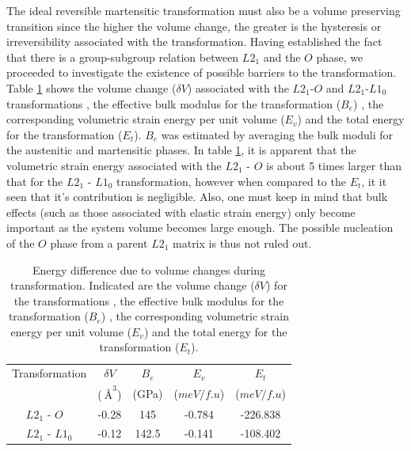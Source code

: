 \documentclass[%
preprint,
 amsmath,amssymb,
 aps,
prb,
showkeys,
]{revtex4-1}
\begin{document}
The ideal reversible martensitic transformation must also be a volume preserving transition \cite{bhattacharya1998theory} since the higher the volume change, the greater is the hysteresis or irreversibility associated with the transformation. Having established the fact that there is a group-subgroup relation between $L2_1$ and the $O$ phase, we proceeded to investigate the existence of possible barriers to the transformation. Table  \ref{tab:volume} shows the volume change ($\delta V$) associated with the $L2_1$-$O$ and  $L2_1$-$L1_0$ transformations , the effective bulk modulus for the transformation ($B_e$) , the corresponding volumetric strain energy per unit volume ($E_v$) and the total energy for the transformation ($E_t$).  $B_e$ was estimated by averaging the bulk moduli for the austenitic and martensitic phases.  In table  \ref{tab:volume}, it is apparent that the volumetric strain energy associated with the $L2_1$ - $O$ is about 5 times larger than that for the  $L2_1$ - $L1_0$ transformation, 
however when compared to the $E_t$, it it seen that it's contribution is negligible. Also, one must keep in mind that bulk effects (such as those associated with elastic strain energy) only become important as the system volume becomes large enough. The possible nucleation of the $O$ phase from a parent $L2_1$ matrix is thus not ruled out.

\begin{table}
\begin{center}
\caption{Energy difference due to volume changes during transformation. Indicated are the volume change ($\delta V$) for the transformations , the effective bulk modulus for the transformation ($B_e$) , the corresponding volumetric strain energy per unit volume ($E_v$) and the total energy for the transformation ($E_t$).}
\setlength{\tabcolsep}{0.8cm}
\begin{tabular}{ccccc}
\hline
Transformation& $\delta V$ & $B_e$ &  $E_v$  & $E_t$ \\ 
 & ($\SI{}{\angstrom}^3$) &  (GPa)&   ($meV/ f.u$)& ($meV/ f.u$)  \\
\hline\hline
$L2_1$ - $O$ \ &  -0.28&   145&  -0.784  & -226.838 \\
\vspace{0.5em}
 $L2_1$ - $L1_0$ & -0.12 &   142.5 & -0.141 & -108.402  \\
\hline
\end{tabular}
\label{tab:volume}
\end{center}
\end{table}
\end{document}
